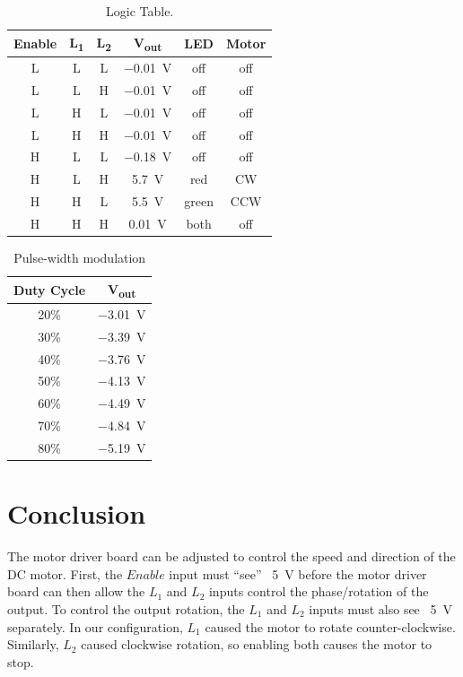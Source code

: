 \begin{table}[hbtp]
  \centering
  \begin{tabular}{ccc|ccc}
    Enable & \si{L_1} & \si{L_2} & \si{V_{out}} & LED & Motor \\
    \hline
    L & L & L & \SI{-0.01}{V} & off & off \\
    L & L & H & \SI{-0.01}{V} & off & off \\
    L & H & L & \SI{-0.01}{V} & off & off \\
    L & H & H & \SI{-0.01}{V} & off & off \\
    H & L & L & \SI{-0.18}{V} & off & off \\
    H & L & H & \SI{+5.7}{V} & red & CW \\
    H & H & L & \SI{+5.5}{V} & green & CCW \\
    H & H & H & \SI{+0.01}{V} & both & off \\
  \end{tabular}
  \caption{\label{tab:logic} Logic Table. }
\end{table}

\begin{table}[hbtp]
  \centering
  \begin{tabular}{cc}
    Duty Cycle & \si{V_{out}} \\
    \hline
    20\% & \SI{-3.01}{V} \\
    30\% & \SI{-3.39}{V} \\
    40\% & \SI{-3.76}{V} \\
    50\% & \SI{-4.13}{V} \\
    60\% & \SI{-4.49}{V} \\
    70\% & \SI{-4.84}{V} \\
    80\% & \SI{-5.19}{V} \\
  \end{tabular}
  \caption{\label{tab:duty} Pulse-width modulation}
\end{table}

\section{Conclusion}
\label{sec:conclusion}

The motor driver board can be adjusted to control the speed and direction of the DC motor.  First, the $Enable$ input must ``see'' ~\SI{5}{V} before the motor driver board can then allow the $L_1$ and $L_2$ inputs control the phase/rotation of the output.  To control the output rotation, the $L_1$ and $L_2$ inputs must also see ~\SI{5}{V} separately.  In our configuration, $L_1$ caused the motor to rotate counter-clockwise.  Similarly, $L_2$ caused clockwise rotation, so enabling both causes the motor to stop.

